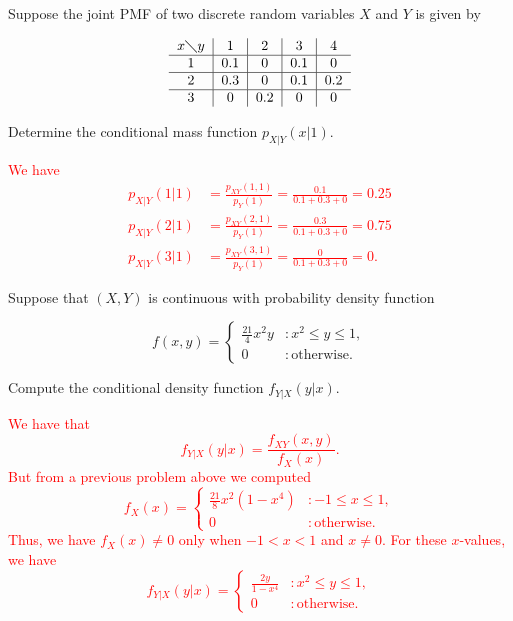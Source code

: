 \documentclass[12pt,reqno]{amsart}
\begin{document}
\bigskip
\prob Suppose the joint PMF of two discrete random variables $X$ and $Y$ is given by

\[\begin{tabular}{c|c|c|c|c}
    $x \diagdown y$ & 1 & 2 & 3 & 4 \\ \hline 
    1 & 0.1 & 0 & 0.1 & 0\\ \hline
    2 & 0.3 & 0 & 0.1 & 0.2 \\ \hline
    3 & 0 & 0.2 & 0 & 0
    \end{tabular}\]

Determine the conditional mass function $p_{X|Y}(x|1)$.

\bigskip
\textcolor{red}{We have
\begin{align*}
    p_{X|Y}(1|1) &= \frac{p_{XY}(1,1)}{p_Y(1)} = \frac{0.1}{0.1+0.3+0} = 0.25 \\
    p_{X|Y}(2|1) &= \frac{p_{XY}(2,1)}{p_Y(1)} = \frac{0.3}{0.1+0.3+0} = 0.75 \\
    p_{X|Y}(3|1) &= \frac{p_{XY}(3,1)}{p_Y(1)} = \frac{0}{0.1+0.3+0} = 0.
\end{align*}}














\bigskip
\prob Suppose that $(X,Y)$ is continuous with probability density function

\[f(x,y) = \begin{cases}
    \frac{21}{4}x^2 y & : x^2 \leq y \leq 1, \\
    0 & : \text{otherwise}.
\end{cases}\]

Compute the conditional density function $f_{Y|X}(y|x)$.

\bigskip
\textcolor{red}{We have that
    \[f_{Y|X}(y|x) = \frac{f_{XY}(x,y)}{f_X(x)}.\]
But from a previous problem above we computed
    \[f_X(x) = \begin{cases}
        \frac{21}{8}x^2(1-x^4) & : -1\leq x \leq 1, \\
        0 & : \text{otherwise}.
    \end{cases}\]
Thus, we have $f_X(x)\neq 0$ only when $-1 < x < 1$ and $x\neq 0$. For these $x$-values, we have
    \[f_{Y|X}(y|x) = \begin{cases}
        \frac{2y}{1-x^4} & : x^2 \leq y \leq 1, \\
        0 & : \text{otherwise}.
    \end{cases}\]}
\end{document}
